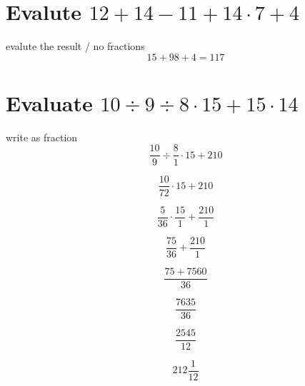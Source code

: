 \documentclass[12pt]{article}
\begin{document}
    
\section{Evalute $12 + 14 -11 + 14 \cdot 7 + 4  $}

evalute the result / no fractions
$$ 15 + 98  + 4 = 117$$

\section{Evaluate $10 \div 9 \div 8 \cdot 15 + 15 \cdot 14$}

write as fraction
$$ \frac{10}{9} \div \frac{8}{1} \cdot 15 + 210 $$

$$ \frac{10}{72} \cdot 15 + 210 $$

$$ \frac{5}{36} \cdot \frac{15}{1} + \frac{210}{1} $$

$$ \frac{75}{36} + \frac{210}{1} $$ 

$$ \frac{75+7560}{36} $$ 

$$ \frac{7635}{36} $$ 

$$ \frac{2545}{12} $$

$$ 212\frac{1}{12} $$
\end{document}
